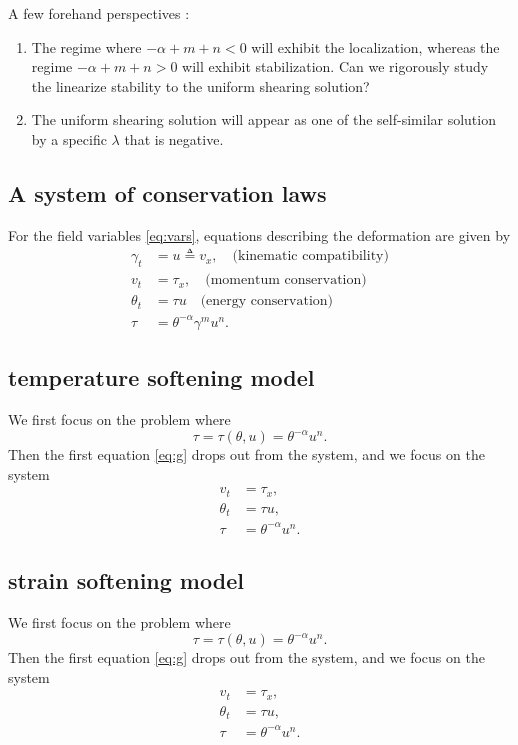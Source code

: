 \documentclass[a4paper,11pt]{article}
\def\blue{\color{blue}}
\begin{document}
A few forehand perspectives :
\begin{enumerate}
 \item The regime where $-\alpha+m+n <0$ will exhibit the localization, whereas the regime $-\alpha+m+n > 0$ will exhibit stabilization. {\blue Can we rigorously study the linearize stability to the uniform shearing solution?}
 \item The uniform shearing solution will appear as one of the self-similar solution by a specific $\lambda$ that is negative.
\end{enumerate}
\subsection{A system of conservation laws}
For the field variables \eqref{eq:vars}, equations describing the deformation are given by
\begin{align}
 \gamma_t &= u\triangleq v_x, \quad \text{(kinematic compatibility)} 	\label{eq:g}\\
 v_t &= \tau_x, \quad \text{(momentum conservation)} 	\label{eq:v}\\
 \theta_t &= \tau u \quad \text{(energy conservation)}	\label{eq:th}\\
 \tau &=\theta^{-\alpha}\gamma^m u^n.			\label{eq:tau}
\end{align}

\subsection{temperature softening model}
We first focus on the problem where
$$ \tau = \tau(\theta,u) = \theta^{-\alpha}u^n.$$
Then the first equation \eqref{eq:g} drops out from the system, and we focus on the system
\begin{equation} \label{eq:orisys}
 \begin{aligned}
  v_t &= \tau_x,\\
  \theta_t &= \tau u,\\
  \tau &=\theta^{-\alpha}u^n.
 \end{aligned}
\end{equation}

\subsection{strain softening model}
We first focus on the problem where
$$ \tau = \tau(\theta,u) = \theta^{-\alpha}u^n.$$
Then the first equation \eqref{eq:g} drops out from the system, and we focus on the system
\begin{equation} \label{eq:orisys}
 \begin{aligned}
  v_t &= \tau_x,\\
  \theta_t &= \tau u,\\
  \tau &=\theta^{-\alpha}u^n.
 \end{aligned}
\end{equation}
\end{document}
